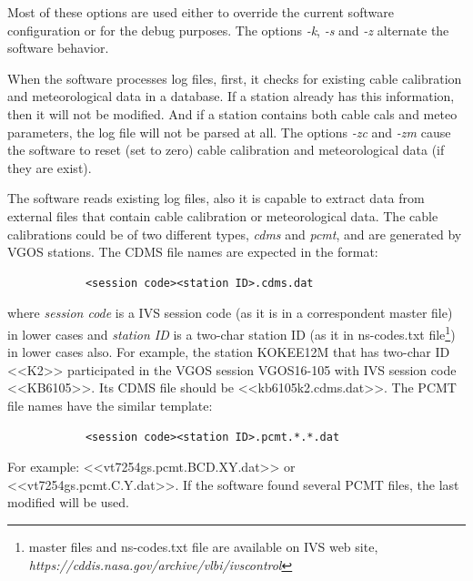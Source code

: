 \documentclass [10pt,letterpaper]{report}
\begin{document}
\noindent
Most of these options are used either to override the current software
configuration or for the debug purposes. The options {\sl -k}, {\sl -s}
and {\sl -z} alternate the software behavior.

When the software processes log files, first, it checks for existing
cable calibration and meteorological data in a database. If a station already
has this information, then it will not be modified. And if a station contains
both cable cals and meteo parameters, the log file will not be parsed at all.
The options {\sl -zc} and {\sl -zm} cause the software to reset (set to zero)
cable calibration and meteorological data (if they are exist).

The software reads existing log files, also it is capable to extract data
from external files that contain cable calibration or meteorological data.
The cable calibrations could be of two different types, {\sl cdms} and {\sl pcmt},
and are generated by VGOS stations. The CDMS file names are expected in the
format:
\begin{verbatim}
            <session code><station ID>.cdms.dat
\end{verbatim}
\noindent
where {\sl session code} is a IVS session code (as it is in a correspondent
master file) in lower cases and {\sl station ID} is a two-char station ID (as
it in ns-codes.txt file\footnote{\label{fn_a}master files and ns-codes.txt
file are available on IVS web site, {\sl https://cddis.nasa.gov/archive/vlbi/ivscontrol}})
in lower cases also. For example, the station KOKEE12M that has two-char ID <<K2>>
participated in the VGOS session VGOS16-105 with IVS session code <<KB6105>>. Its
CDMS file should be <<kb6105k2.cdms.dat>>. The PCMT file names have the
similar template:
\begin{verbatim}
            <session code><station ID>.pcmt.*.*.dat
\end{verbatim}
\noindent
For example: <<vt7254gs.pcmt.BCD.XY.dat>> or <<vt7254gs.pcmt.C.Y.dat>>.
If the software found several PCMT files, the last modified will be used.
\end{document}
